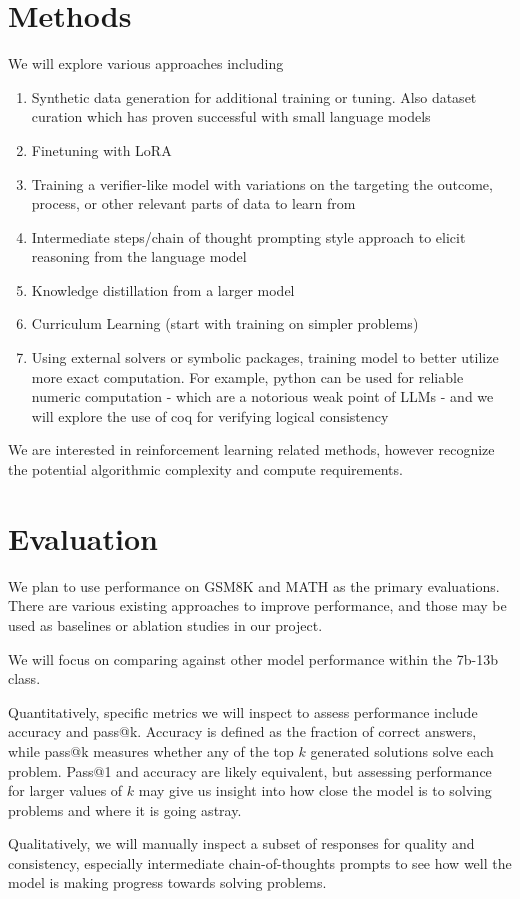 \documentclass{article}
\begin{document}
\section{Methods}
We will explore various approaches including
\begin{enumerate}
\item Synthetic data generation for additional training or tuning. Also dataset curation which has proven successful with small language models \cite{gunasekar} 
\item Finetuning with LoRA \cite{hu}
\item Training a verifier-like model with variations on the targeting the outcome, process, or other relevant parts of data to learn from
\item Intermediate steps/chain of thought \cite{wei} prompting style approach to elicit reasoning from the language model
\item Knowledge distillation from a larger model
\item Curriculum Learning (start with training on simpler problems)
\item Using external solvers or symbolic packages, training model to better utilize more exact computation. For example, python can be used for reliable numeric computation - which are a notorious weak point of LLMs - and we will explore the use of coq for verifying logical consistency
\end{enumerate}

We are interested in reinforcement learning related methods, however recognize the potential algorithmic complexity and compute requirements.


\section{Evaluation}
We plan to use performance on GSM8K and MATH as the primary evaluations. There are various existing approaches to improve performance, and those may be used as baselines or ablation studies in our project.

We will focus on comparing against other model performance within the 7b-13b class. 

Quantitatively, specific metrics we will inspect to assess performance include accuracy and pass@k. Accuracy is defined as the fraction of correct answers, while pass@k measures whether any of the top $k$ generated solutions solve each problem. Pass@1 and accuracy are likely equivalent, but assessing performance for larger values of $k$ may give us insight into how close the model is to solving problems and where it is going astray. 

Qualitatively, we will manually inspect a subset of responses for quality and consistency, especially intermediate chain-of-thoughts prompts to see how well the model is making progress towards solving problems.



\end{document}
